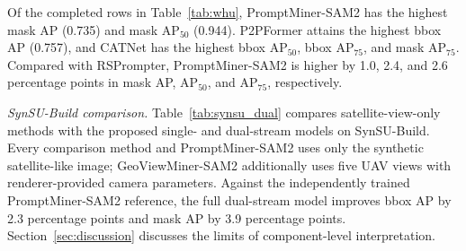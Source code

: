 \documentclass[letterpaper,journal]{IEEEtran}
\begin{document}
Of the completed rows in Table~\ref{tab:whu}, PromptMiner-SAM2 has the highest mask AP (0.735)
and mask AP$_{50}$ (0.944). P2PFormer attains the highest bbox AP (0.757), and CATNet has the
highest bbox AP$_{50}$, bbox AP$_{75}$, and mask AP$_{75}$. Compared with RSPrompter,
PromptMiner-SAM2 is higher by 1.0, 2.4, and 2.6 percentage points in mask AP, AP$_{50}$, and
AP$_{75}$, respectively.

\noindent\textit{SynSU-Build comparison.}
Table~\ref{tab:synsu_dual} compares satellite-view-only methods with the proposed single- and
dual-stream models on SynSU-Build. Every comparison method and PromptMiner-SAM2 uses only the
synthetic satellite-like image; GeoViewMiner-SAM2 additionally uses five UAV views with
renderer-provided camera parameters. Against the independently trained PromptMiner-SAM2
reference, the full dual-stream model improves bbox AP by 2.3 percentage points and mask AP by
3.9 percentage points. Section~\ref{sec:discussion} discusses the limits of component-level
interpretation.
\end{document}
